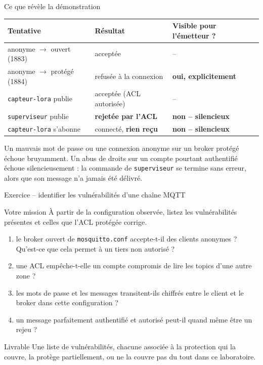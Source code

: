 \documentclass[aspectratio=169]{beamer}
\begin{document}
\begin{frame}{Ce que révèle la démonstration}
  \tiny
  \begin{center}
  \begin{tabular}{@{}lll@{}}
    \toprule
    Tentative & Résultat & Visible pour l'émetteur ? \\
    \midrule
    anonyme $\rightarrow$ ouvert (1883) & acceptée & -- \\
    anonyme $\rightarrow$ protégé (1884) & refusée à la connexion & \textbf{oui, explicitement} \\
    \texttt{capteur-lora} publie & acceptée (ACL autorisée) & -- \\
    \texttt{superviseur} publie & \textbf{rejetée par l'ACL} & \textbf{non -- silencieux} \\
    \texttt{capteur-lora} s'abonne & connecté, \textbf{rien reçu} & \textbf{non -- silencieux} \\
    \bottomrule
  \end{tabular}
  \end{center}
  \vfill
  \alert{Un mauvais mot de passe ou une connexion anonyme sur un broker protégé échoue bruyamment. Un abus de droits sur un compte pourtant authentifié échoue silencieusement : la commande de \texttt{superviseur} se termine sans erreur, alors que son message n'a jamais été délivré.}
\end{frame}

\begin{frame}{Exercice -- identifier les vulnérabilités d'une chaîne MQTT}
  \begin{block}{Votre mission}
    À partir de la configuration observée, listez les vulnérabilités présentes et celles que l'ACL protégée corrige.
  \end{block}
  \begin{enumerate}
    \item le broker ouvert de \texttt{mosquitto.conf} accepte-t-il des clients anonymes ? Qu'est-ce que cela permet à un tiers non autorisé ?
    \item une ACL empêche-t-elle un compte compromis de lire les topics d'une autre zone ?
    \item les mots de passe et les messages transitent-ils chiffrés entre le client et le broker dans cette configuration ?
    \item un message parfaitement authentifié et autorisé peut-il quand même être un rejeu ?
  \end{enumerate}
  \begin{block}{Livrable}
    Une liste de vulnérabilités, chacune associée à la protection qui la couvre, la protège partiellement, ou ne la couvre pas du tout dans ce laboratoire.
  \end{block}
\end{frame}
\end{document}
